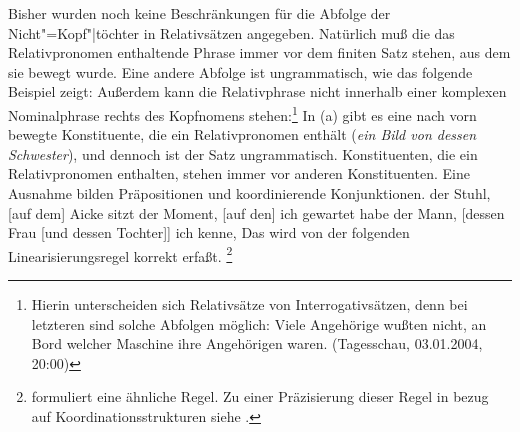 
Bisher wurden noch keine Beschränkungen
für die Abfolge der Nicht"=Kopf"|töchter in Relativsätzen angegeben. Natürlich muß die das
Relativpronomen enthaltende Phrase immer vor dem finiten Satz stehen, aus dem sie bewegt wurde. Eine
andere Abfolge ist ungrammatisch, wie das folgende Beispiel zeigt:
\z
Außerdem kann die Relativphrase nicht innerhalb einer komplexen
Nominalphrase rechts des Kopfnomens stehen:\footnote{
  Hierin unterscheiden sich Relativsätze von Interrogativsätzen,
  denn bei letzteren sind solche Abfolgen möglich:
\ea
Viele Angehörige wußten nicht, an Bord welcher Maschine ihre Angehörigen waren.
  (Tagesschau, 03.01.2004, 20:00)
\zlast
}
\eal
{}
\zl
In (a) gibt es eine nach vorn bewegte Konstituente, die ein Relativpronomen enthält 
(\emph{ein Bild von dessen Schwester}), und dennoch ist der Satz ungrammatisch.
Konstituenten, die ein Relativpronomen enthalten, stehen immer vor anderen Konstituenten.
Eine Ausnahme bilden Präpositionen 
und koordinierende Konjunktionen.
\eal
\ex der Stuhl, [auf dem] Aicke sitzt
\ex der Moment, [auf den] ich gewartet habe
\zl
\ea
der Mann, [dessen Frau [und dessen Tochter]] ich kenne,
\z
Das wird von der folgenden Linearisierungsregel korrekt erfaßt.
\footnote{
        \citet*{Riemsdijk85} 
        formuliert eine ähnliche Regel. Zu einer Präzisierung dieser
        Regel in bezug auf Koordinationsstrukturen siehe .%
}
